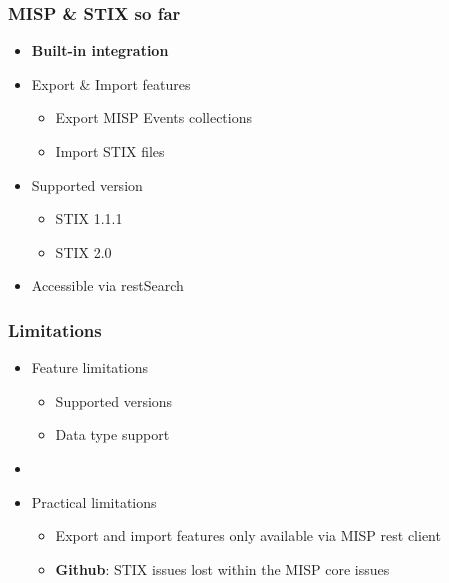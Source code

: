 
\begin{frame}[t,plain]
\titlepage
\end{frame}

\begin{frame}
    \frametitle{MISP \& STIX so far}
    \begin{itemize}
        \item{\bf Built-in integration}
        \item Export \& Import features
        \begin{itemize}
            \item Export MISP Events collections
            \item Import STIX files
        \end{itemize}
        \item Supported version
        \begin{itemize}
            \item STIX 1.1.1
            \item STIX 2.0
        \end{itemize}
        \item Accessible via restSearch
    \end{itemize}
\end{frame}

\begin{frame}
    \frametitle{Limitations}
    \begin{itemize}
        \item Feature limitations
        \begin{itemize}
            \item Supported versions
            \item Data type support
        \end{itemize}
        \item []
        \item Practical limitations
        \begin{itemize}
            \item Export and import features only available via MISP rest client
            \item {\bf Github}: STIX issues lost within the MISP core issues
        \end{itemize}
    \end{itemize}
\end{frame}

